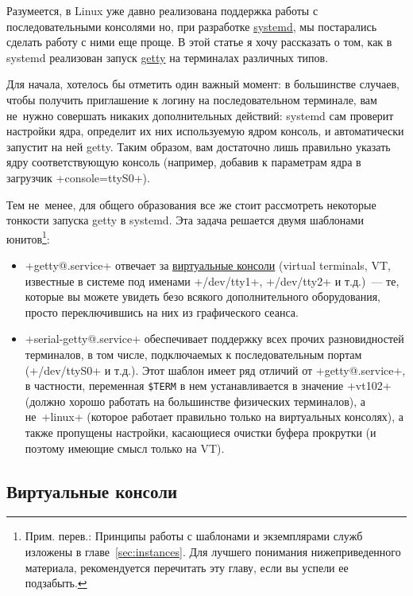 \documentclass[10pt,oneside,a4paper]{article}
\begin{document}
Разумеется, в Linux уже давно реализована поддержка работы с последовательными
консолями но, при разработке
\href{http://www.freedesktop.org/wiki/Software/systemd}{systemd}, мы постарались
сделать работу с ними еще проще. В этой статье я хочу рассказать о том, как в
systemd реализован запуск \href{https://ru.wikipedia.org/wiki/Getty}{getty} на
терминалах различных типов.

Для начала, хотелось бы отметить один важный момент: в большинстве случаев, чтобы
получить приглашение к логину на последовательном терминале, вам не~нужно
совершать никаких дополнительных действий: systemd сам проверит настройки ядра,
определит их них используемую ядром консоль, и автоматически запустит на ней
getty. Таким образом, вам достаточно лишь правильно указать ядру соответствующую
консоль (например, добавив к параметрам ядра в загрузчик +console=ttyS0+).

Тем не~менее, для общего образования все же стоит рассмотреть некоторые
тонкости запуска getty в systemd. Эта задача решается двумя шаблонами
юнитов\footnote{Прим. перев.: Принципы работы с шаблонами и экземплярами служб
изложены в главе~\ref{sec:instances}. Для лучшего понимания нижеприведенного
материала, рекомендуется перечитать эту главу, если вы успели ее подзабыть.}:
\begin{itemize}
	\item +getty@.service+ отвечает за
		\href{https://ru.wikipedia.org/wiki/%D0%92%D0%B8%D1%80%D1%82%D1%83%D0%B0%D0%BB%D1%8C%D0%BD%D0%B0%D1%8F_%D0%BA%D0%BE%D0%BD%D1%81%D0%BE%D0%BB%D1%8C}%
		{виртуальные консоли} (virtual terminals, VT, известные в
		системе под именами +/dev/tty1+, +/dev/tty2+ и т.д.)~--- те,
		которые вы можете увидеть безо всякого дополнительного
		оборудования, просто переключившись на них из графического
		сеанса.

	\item +serial-getty@.service+ обеспечивает поддержку всех прочих
		разновидностей терминалов, в том числе, подключаемых к
		последовательным портам (+/dev/ttyS0+ и т.д.). Этот шаблон имеет
		ряд отличий от +getty@.service+, в частности, переменная \verb+$TERM+
		в нем устанавливается в значение +vt102+ (должно хорошо работать
		на большинстве физических терминалов), а не~+linux+ (которое
		работает правильно только на виртуальных консолях), а также
		пропущены настройки, касающиеся очистки буфера прокрутки (и
		поэтому имеющие смысл только на VT).
\end{itemize}

\subsection{Виртуальные консоли}
\end{document}
